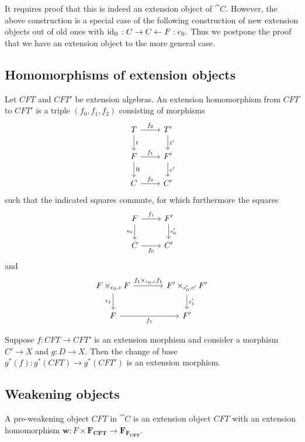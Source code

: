 It requires proof that this is indeed an extension object of $\cat{C}$. However, the above
construction is a special case of the following construction of new extension objects out
of old ones with ${\mathrm{id}_{\mathrm{ft}_{}}}:C\rightarrow C\leftarrow F:e_0$. Thus we postpone the proof
that we have an extension object to the more general case. 

\subsection{Homomorphisms of extension objects}
\begin{defn}
Let $CFT$ and $CFT'$ be extension algebras. An extension homomorphism from 
$CFT$ to $CFT'$ is a triple $(f_0,f_1,f_2)$ consisting of morphisms
\begin{equation*}
\begin{tikzcd}
T 
  \ar{r}{f_2}
  \ar{d}{t}
  &
T'
  \ar{d}{t'}
  \\
F 
  \ar{r}{f_1}
  \ar{d}{\eft}
  &
F'
  \ar{d}{c'}
  \\
C 
  \ar{r}{f_0}
  &
C'
\end{tikzcd}
\end{equation*}
such that the indicated squares commute, for which furthermore the squares
\begin{equation*}
\begin{tikzcd}
F \ar{r}{f_1}
  \ar{d}[swap]{\epsilon_0}
  &
F'
  \ar{d}{\epsilon_0'}
  \\
C \ar{r}[swap]{f_0}
  &
C'
\end{tikzcd}
\end{equation*}
and
\begin{equation*}
\begin{tikzcd}[column sep=large]
F\times_{\epsilon_0,c} F
  \ar{r}{f_1\times_{\epsilon_0,c} f_1}
  \ar{d}[swap]{\epsilon_1}
  &
F'\times_{\epsilon_0',c'} F'
  \ar{d}{\epsilon_1'}
  \\
F \ar{r}[swap]{f_1}
  &
F'
\end{tikzcd}
\end{equation*}
\end{defn}

\begin{lem}
Suppose $f:CFT\to CFT'$ is an extension morphism and consider a morphism
$C'\to X$ and $g:D\to X$. Then the change of base $g^\ast(f):g^\ast(CFT)\to
g^\ast(CFT')$ is an extension morphism.
\end{lem}

\subsection{Weakening objects}
\begin{defn}
A pre-weakening object $CFT$ in $\cat{C}$ is an extension object $CFT$ with 
an extension homomorphism $\mathbf{w}:F\times\mathbf{F_{CFT}}\to \mathbf{F_{F_{CFT}}}$.
\end{defn}

